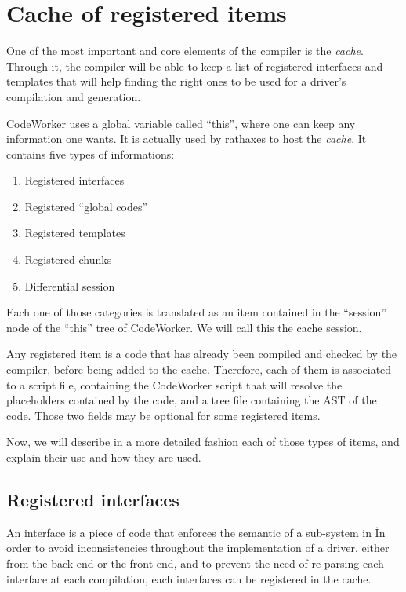 \documentclass[american]{rtxreport}
\begin{document}
\section{Cache of registered items}

One of the most important and core elements of the compiler is the
\emph{cache}.  Through it, the compiler will be able to keep a list of
registered interfaces and templates that will help finding the right ones to be
used for a driver's compilation and generation.

CodeWorker uses a global variable called ``this'', where one can keep any
information one wants. It is actually used by rathaxes to host the
\emph{cache}. It contains five types of informations:
\begin{enumerate}
    \item Registered interfaces
    \item Registered ``global codes''
    \item Registered templates
    \item Registered chunks
    \item Differential session
\end{enumerate}

Each one of those categories is translated as an item contained in the
``session'' node of the ``this'' tree of CodeWorker. We will call this the
cache session.

Any registered item is a code that has already been compiled and checked by the
compiler, before being added to the cache. Therefore, each of them is
associated to a script file, containing the CodeWorker script that will resolve
the placeholders contained by the code, and a tree file containing the AST of
the code. Those two fields may be optional for some registered items.

Now, we will describe in a more detailed fashion each of those types of items,
and explain their use and how they are used.

\subsection{Registered interfaces}

An interface is a piece of code that enforces the semantic of a sub-system in
\rtx\. In order to avoid inconsistencies throughout the implementation of a
driver, either from the back-end or the front-end, and to prevent the need of
re-parsing each interface at each compilation, each interfaces can be
registered in the cache.
\end{document}

